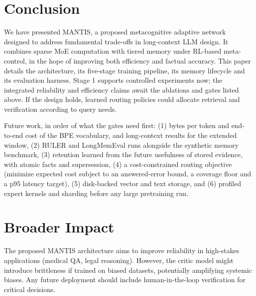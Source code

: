 \documentclass{article}
\begin{document}
\section{Conclusion}

We have presented MANTIS, a proposed metacognitive adaptive network designed to address fundamental trade-offs in long-context LLM design. It combines sparse MoE computation with tiered memory under RL-based meta-control, in the hope of improving both efficiency and factual accuracy. This paper details the architecture, its five-stage training pipeline, its memory lifecycle and its evaluation harness. Stage 1 supports controlled experiments now; the integrated reliability and efficiency claims await the ablations and gates listed above. If the design holds, learned routing policies could allocate retrieval and verification according to query needs.

Future work, in order of what the gates need first: (1) bytes per token and end-to-end cost of the BPE vocabulary, and long-context results for the extended window, (2) RULER and LongMemEval runs alongside the synthetic memory benchmark, (3) retention learned from the future usefulness of stored evidence, with atomic facts and supersession, (4) a cost-constrained routing objective (minimize expected cost subject to an answered-error bound, a coverage floor and a p95 latency target), (5) disk-backed vector and text storage, and (6) profiled expert kernels and sharding before any large pretraining run.

\section*{Broader Impact}

The proposed MANTIS architecture aims to improve reliability in high-stakes applications (medical QA, legal reasoning). However, the critic model might introduce brittleness if trained on biased datasets, potentially amplifying systemic biases. Any future deployment should include human-in-the-loop verification for critical decisions.
\end{document}
